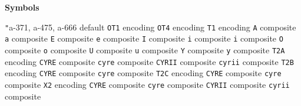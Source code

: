 \documentclass[twoside]{ltxdoc}
\makeatletter
\renewenvironment{theindex}{%
   \@restonecoltrue
   \if@twocolumn\@restonecolfalse\fi
   \columnseprule \z@
   \columnsep 35\p@
   \twocolumn[\index@prologue]%
   \IndexParms
   \let\item\@idxitem
   \ignorespaces
}{\if@restonecol\onecolumn\else\clearpage\fi}
\makeatother
\begin{document}
 \begin{theindex} 
 \makeatletter\scan@allowedfalse
{\bfseries\hfil Symbols\hfil}\nopagebreak

  \item \texttt  {"}\pfill a-371, a-475, a-666
    \subitem default\pfill {}
    \subitem \texttt  {OT1} encoding\pfill {}
    \subitem \texttt  {OT4} encoding\pfill {}
    \subitem \texttt  {T1} encoding\pfill {}
      \subsubitem \texttt  {A} composite\pfill {}
      \subsubitem \texttt  {a} composite\pfill {}
      \subsubitem \texttt  {E} composite\pfill {}
      \subsubitem \texttt  {e} composite\pfill {}
      \subsubitem \texttt  {I} composite\pfill {}
      \subsubitem \texttt  {i} composite\pfill {}
      \subsubitem \texttt  {i} composite\pfill 
      \subsubitem \texttt  {O} composite\pfill {}
      \subsubitem \texttt  {o} composite\pfill {}
      \subsubitem \texttt  {U} composite\pfill {}
      \subsubitem \texttt  {u} composite\pfill {}
      \subsubitem \texttt  {Y} composite\pfill {}
      \subsubitem \texttt  {y} composite\pfill {}
    \subitem \texttt  {T2A} encoding\pfill {}
      \subsubitem \texttt  {CYRE} composite\pfill 
      \subsubitem \texttt  {cyre} composite\pfill 
      \subsubitem \texttt  {CYRII} composite\pfill 
      \subsubitem \texttt  {cyrii} composite\pfill 
    \subitem \texttt  {T2B} encoding\pfill {}
      \subsubitem \texttt  {CYRE} composite\pfill 
      \subsubitem \texttt  {cyre} composite\pfill 
    \subitem \texttt  {T2C} encoding\pfill {}
      \subsubitem \texttt  {CYRE} composite\pfill 
      \subsubitem \texttt  {cyre} composite\pfill 
    \subitem \texttt  {X2} encoding\pfill {}
      \subsubitem \texttt  {CYRE} composite\pfill 
      \subsubitem \texttt  {cyre} composite\pfill 
      \subsubitem \texttt  {CYRII} composite\pfill 
      \subsubitem \texttt  {cyrii} composite\pfill 

\end{theindex}
\end{document}
